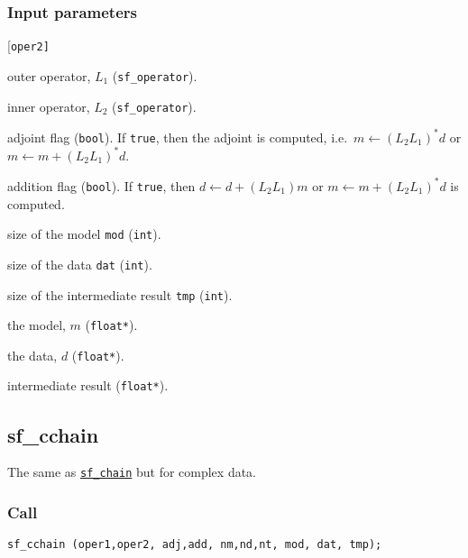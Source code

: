 \subsubsection*{Input parameters}
\begin{desclist}{\tt }{\quad}[\tt oper2]
   \setlength\itemsep{0pt}
   \item[oper1] outer operator, $L_1$ (\texttt{sf\_operator}). 
   \item[oper2] inner operator, $L_2$ (\texttt{sf\_operator}). 
   \item[adj] adjoint flag (\texttt{bool}). If \texttt{true}, then the adjoint is computed, i.e.~$m\leftarrow (L_2L_1)^*d$ or $m\leftarrow m+(L_2L_1)^*d$. 
   \item[add] addition flag (\texttt{bool}). If \texttt{true}, then $d\leftarrow d+(L_2L_1)m$ or $m\leftarrow m+(L_2L_1)^*d$ is computed.  
   \item[nm]    size of the model \texttt{mod} (\texttt{int}). 
   \item[nd]    size of the data \texttt{dat} (\texttt{int}). 
   \item[nt]    size of the intermediate result \texttt{tmp}  (\texttt{int}). 
   \item[mod]   the model, $m$ (\texttt{float*}).
   \item[dat]   the data, $d$ (\texttt{float*}).
   \item[tmp]   intermediate result (\texttt{float*}).
\end{desclist}




\subsection{{sf\_cchain}}
The same as \hyperref[sec:sf_chain]{\texttt{sf\_chain}} but for complex data.

\subsubsection*{Call}
\begin{verbatim}sf_cchain (oper1,oper2, adj,add, nm,nd,nt, mod, dat, tmp);\end{verbatim}

